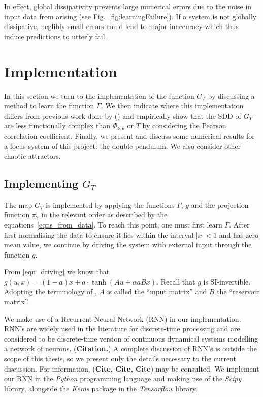 \documentclass[a4paper,12pt,twoside]{report}
\begin{document}
In effect, global dissipativity prevents large numerical errors due to the noise in input data from arising (see Fig.~\ref{fig:learningFailure}). 
If a system is not globally dissipative, neglibly small errors could lead to major inaccuracy which thus induce predictions to utterly fail.



\chapter{Implementation} \label{ch5}
 
In this section we turn to the implementation of the function $G_T$ by discussing a method to learn the function $\Gamma$. We then indicate where this implementation differs from previous work done by (\cite{manjunath2021universal}) and empirically show that the SDD of $G_T$ are less functionally complex than $\Phi_{k, \theta}$ or $T$ by considering the Pearson correlation coefficient. 
Finally, we present and discuss some numerical results for a focus system of this project: the double pendulum. We also consider other chaotic attractors.

\section{Implementing $G_T$}
The map $G_T$ is implemented by applying the functions $\Gamma$, $g$ and the projection function $\pi_2$ in the relevant order as described by the equations~\ref{eqns_from_data}. To reach this point, one must first learn $\Gamma$.
After first normalising the data to ensure it lies within the interval $|x| < 1$ and has zero mean value, we continue by driving the system with external input through the function $g$.

From \eqref{eqn_driving} we know that $ g(u,x)=(1-a)x+a{\cdot}\tanh(Au+\alpha{a}Bx)$. Recall that $g$ is SI-invertible. Adopting the terminology of \cite{manjunath2021universal}, $A$ is called the “input matrix” and $B$ the “reservoir matrix”. 

We make use of a Recurrent Neural Network (RNN) in our implementation. RNN's are widely used in the literature for discrete-time processing and are considered to be discrete-time version of continuous dynamical systems modelling a network of neurons. (\textbf{Citation.})
A complete discussion of RNN's is outside the scope of this thesis, so we present only the details necessary to the current discussion. For information, (\textbf{Cite, Cite, Cite}) may be consulted. We implement our RNN in the \emph{Python} programming language and making use of the \emph{Scipy} library, alongside the \emph{Keras} package in the \emph{Tensorflow} library.
\end{document}
